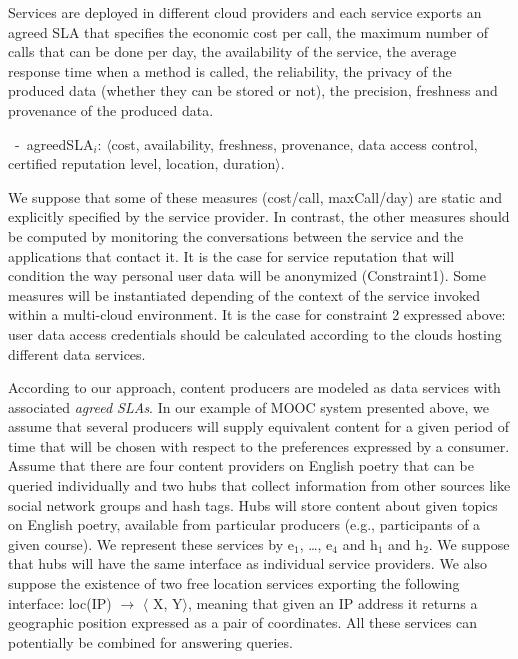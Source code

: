 Services are deployed in different cloud providers and each service exports an agreed SLA that specifies the economic cost per call, the maximum number of calls that can be done per day, the availability of the service, the average response time when a method is called, the reliability, the privacy of the produced data (whether they can be stored or not), the precision, freshness and provenance of the produced data. 


\begin{trivlist}\sf\footnotesize
\item[~-~agreedSLA$_i$:] $\langle$cost, availability, freshness, provenance, data access control, certified reputation level, location, duration$\rangle$. 
 \end{trivlist}
 
We suppose that some of these measures ({\sf cost/call, maxCall/day}) are static and explicitly specified by the service provider. 
In contrast, the other measures should be computed by monitoring the conversations between the service and the applications that contact it.  It is the case for service reputation that will condition the way personal user data will be anonymized (Constraint1).  Some measures will be instantiated depending of the context of  the service invoked within a multi-cloud environment. It is the case for constraint 2 expressed above:   user data access credentials should be calculated according to the clouds hosting different data services.


According to our approach, content producers are modeled as data services with associated \textit{agreed SLAs}. 
In our example of MOOC system presented above, we assume that several producers will supply equivalent content for a given period of time  that will be chosen with respect to the  preferences expressed by a consumer. 
Assume that there are four content providers on English poetry that can be queried individually and two hubs that collect information from other sources like social network groups and hash tags.
Hubs will store content about given topics on  English poetry, available from particular producers (e.g., participants of a given course).
We represent these services by {\sf e$_1$, \dots, e$_4$} and {\sf h$_1$} and {\sf h$_2$}. We suppose that hubs will have the same interface as individual service providers.
We also suppose the existence of two free location services exporting the following interface: {\sf loc(IP) $\rightarrow$ $\langle$ X, Y$\rangle$}, meaning that given an IP address it returns a geographic position expressed as a pair of coordinates. 
All these services can potentially be combined for answering queries.

